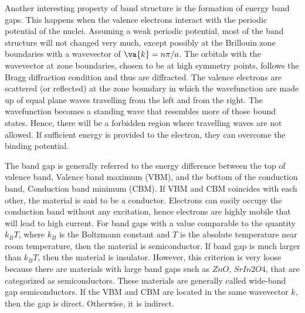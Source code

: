 Another interesting property of band structure is the formation of energy band gaps. This happens when the valence electrons interact with the periodic potential of the nuclei. Assuming a weak periodic potential, most of the band structure will not changed very much, except possibly at the Brillouin zone boundaries with a wavevector of $\va{k} = n \pi/ a$. The orbitals with the wavevector at zone boundaries, chosen to be at high symmetry points, follows the Bragg diffraction condition and thus are diffracted. The valence electrons are scattered (or reflected) at the zone boundary in which the wavefunction are made up of equal plane waves travelling from the left and from the right. The wavefunction becomes a standing wave that resembles more of those bound states. Hence, there will be a forbidden region where travelling waves are not allowed. If sufficient energy is provided to the electron, they can overcome the  binding potential.

The band gap is generally referred to the energy difference between the top of valence band, Valence band maximum (VBM),  and the bottom of the conduction band, Conduction band minimum (CBM). If VBM and CBM coincides with each other, the material is said to be a conductor. Electrons can easily occupy the conduction band without any excitation, hence electrons are highly mobile that will lead to high current. For band gaps with a value comparable to the quantity $k_B T$, where $k_B$ is the Boltzmann constant and  $T$ is the absolute temperature near room temperature, then the material is semiconductor. If band gap is much larger than $k_B T$, then the material is insulator. However, this criterion is very loose because there are materials with large band gaps such as $ZnO$, $SrIn2O4$, that are categorized as semiconductors. These materials are generally called wide-band gap semiconductors. If the VBM and CBM are located in the same wavevector $k$, then the gap is direct. Otherwise, it is indirect. 


